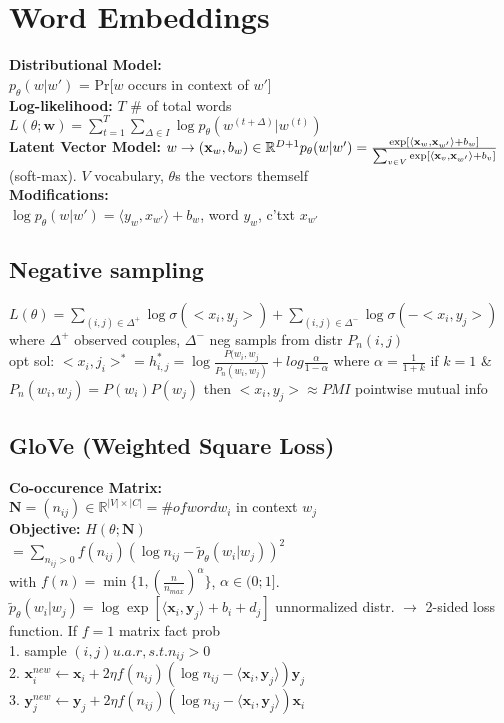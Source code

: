 \section{Word Embeddings}
\textbf{Distributional Model:}\\
$p_\theta(w|w')$ = Pr[$w$ occurs in context of $w'$]\\
\textbf{Log-likelihood:} $T$ \# of total words\\
$L(\theta; \mathbf{w}) = \sum_{t=1}^T\sum_{\Delta \in I}{\log p_\theta(w^{(t+\Delta)}|w^{(t)})}$\\
\textbf{Latent Vector Model:} $w \rightarrow (\mathbf{x}_w, b_w) \in \mathbb{R}^{D+1} \\p_{\theta}(w|w') = \frac{\exp[\langle \mathbf{x}_w,\mathbf{x}_{w'}\rangle + b_w]}{\sum_{v\in V}{\exp[\langle \mathbf{x}_v,\mathbf{x}_{w'}\rangle + b_v ]}}$ (soft-max). 
$V$ vocabulary, $\theta$s the vectors themself\\
\textbf{Modifications:}\\
$\log p_{\theta}(w|w') = \langle  y_{w} , x_{w'} \rangle + b_w$,  word $y_w$, c'txt $x_{w'}$\\

\subsection*{Negative sampling}
$L(\theta) = \sum_{(i,j) \in \Delta^+}{\log{\sigma(<x_i, y_j>)}} + \sum_{(i,j) \in \Delta^-}{\log {\sigma(-<x_i, y_j>)}}$ where $\Delta^+$ observed couples, $\Delta^-$ neg sampls from distr $P_n(i,j)$\\
opt sol: $<x_i,j_i>^* = h_{i,j}^* = \log{\frac{P(w_i,w_j}{P_n(w_i,w_j)}} + log{\frac{\alpha}{1 - \alpha}}$ where $\alpha = \frac{1}{1+k}$ if $k=1$ \& $P_n(w_i,w_j)=P(w_i)P(w_j)$ then $<x_i,y_j> \approx PMI$ pointwise mutual info


\subsection*{GloVe (Weighted Square Loss)}
\textbf{Co-occurence Matrix:}\\
$\mathbf{N} = (n_{ij}) \in \mathbb{R}^{|V|\times|C|} = \# of word w_i$ in context $w_j$\\
\textbf{Objective:} $H(\theta;\mathbf{N})$\\
$= \sum_{n_{ij} > 0} f(n_{ij})(\log n_{ij} - \tilde{p}_\theta(w_i | w_j))^2$\\
with $f(n) = \min\{1, (\frac{n}{n_{max}})^\alpha\}$, $\alpha \in (0;1]$.\\
$\tilde{p}_\theta(w_i | w_j) = \log \exp[\langle \mathbf{x}_i, \mathbf{y}_j \rangle + b_i + d_j]$ unnormalized distr. $\rightarrow$ 2-sided loss function. If $f=1$ matrix fact prob\\
1. sample $(i,j) u.a.r, s.t. n_{ij}>0$\\
2. $\mathbf{x}_i^{new} \leftarrow \mathbf{x}_i + 2\eta f(n_{ij})(\log n_{ij} - \langle \mathbf{x}_i, \mathbf{y}_j \rangle)\mathbf{y}_j$\\
3. $\mathbf{y}_j^{new} \leftarrow \mathbf{y}_j + 2\eta f(n_{ij})(\log n_{ij} - \langle \mathbf{x}_i, \mathbf{y}_j \rangle)\mathbf{x}_i$
